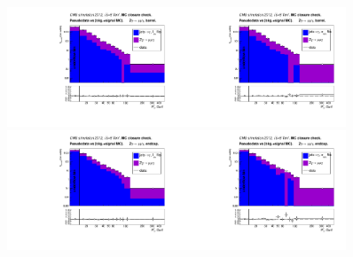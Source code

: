 \begin{figure}[htb]
  \begin{center}
   \includegraphics[width=0.45\textwidth]{../figs/figs_v11/MUON_ZGamma/PrepareYields/c_DATAvsBkgPlusSigMCc_MUON_ZGamma_TEMPL_CHISO_UNblind_MCclosure__Barrel__phoEt_MCclosure.pdf}\includegraphics[width=0.45\textwidth]{../figs/figs_v11/MUON_ZGamma/PrepareYields/c_DATAvsBkgPlusSigMCc_MUON_ZGamma_TEMPL_SIHIH_UNblind_MCclosure__Barrel__phoEt_MCclosure.pdf}  \\
   \includegraphics[width=0.45\textwidth]{../figs/figs_v11/MUON_ZGamma/PrepareYields/c_DATAvsBkgPlusSigMCc_MUON_ZGamma_TEMPL_CHISO_UNblind_MCclosure__Endcap__phoEt_MCclosure.pdf}\includegraphics[width=0.45\textwidth]{../figs/figs_v11/MUON_ZGamma/PrepareYields/c_DATAvsBkgPlusSigMCc_MUON_ZGamma_TEMPL_SIHIH_UNblind_MCclosure__Endcap__phoEt_MCclosure.pdf}  \\

\end{center}
\end{figure}
